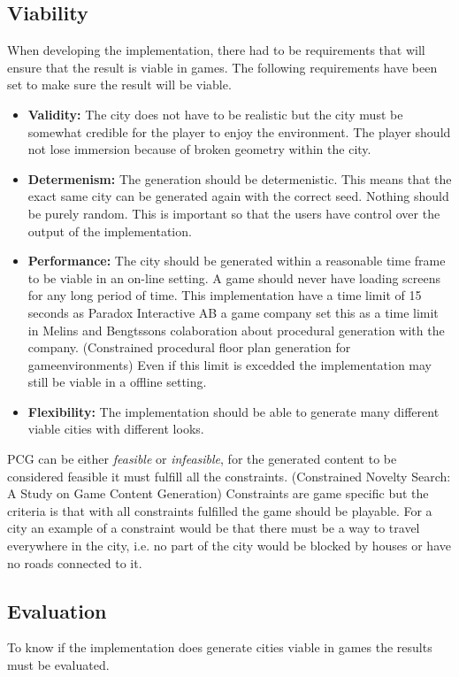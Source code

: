 	
	\subsection{Viability}
	When developing the implementation, there had to be requirements that will ensure that the result is viable in games.
	The following requirements have been set to make sure the result will be viable.
	
	\begin{itemize}
		\item \textbf{Validity:} The city does not have to be realistic but the city must be somewhat credible for the player to enjoy the environment. The player should not lose immersion because of broken geometry within the city.
		
		\item \textbf{Determenism:} The generation should be determenistic. This means that the exact same city can be generated again with the correct seed. Nothing should be purely random. This is important so that the users have control over the output of the implementation.
		
		\item \textbf{Performance:} The city should be generated within a reasonable time frame to be viable in an on-line setting. A game should never have loading screens for any long period of time. This implementation have a time limit of 15 seconds as Paradox Interactive AB a game company set this as a time limit in Melins and Bengtssons colaboration about procedural generation with the company. (Constrained procedural floor
		plan generation for gameenvironments) Even if this limit is excedded the implementation may still be viable in a offline setting.
		
		\item \textbf{Flexibility: } The implementation should be able to generate many different viable cities with different looks.
	\end{itemize} 

	PCG can be either \textit{feasible} or \textit{infeasible}, for the generated content to be considered feasible it must fulfill all the constraints. (Constrained Novelty Search: A Study on Game Content Generation) Constraints are game specific but the criteria is that with all constraints fulfilled the game should be playable. For a city an example of a constraint would be that there must be a way to travel everywhere in the city, i.e. no part of the city would be blocked by houses or have no roads connected to it.
	
	\subsection{Evaluation}
	To know if the implementation does generate cities viable in games the results must be evaluated.